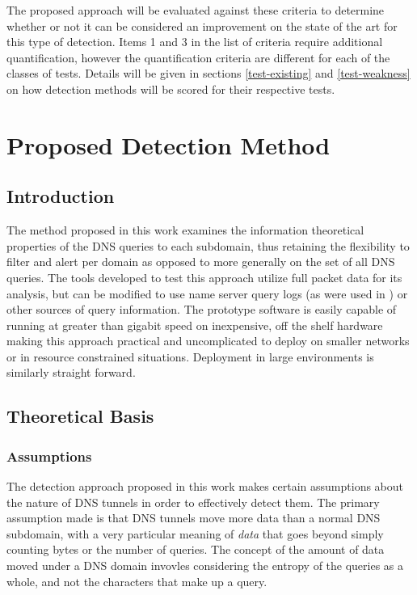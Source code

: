 \documentclass[12pt]{report}
\theoremstyle{remark}
\theoremstyle{definition}
\theoremstyle{definition}
\theoremstyle{definition}
\begin{document}
The proposed approach will be evaluated against these criteria to determine
whether or not it can be considered an improvement on the state of the art for
this type of detection. Items 1 and 3 in the list of criteria require additional
quantification, however the quantification criteria are different for each of
the classes of tests. Details will be given in sections \ref{test-existing} and
\ref{test-weakness} on how detection methods will be scored for their respective
tests.

\chapter{Proposed Detection Method}
\label{proposed-method}

\section{Introduction}
The method proposed in this work examines the information theoretical properties
of the DNS queries to each subdomain, thus retaining the flexibility to filter
and alert per domain as opposed to more generally on the set of all DNS queries.
The tools developed to test this approach utilize full packet data for its
analysis, but can be modified to use name server query logs (as were used in
\cite{Romana2007}) or other sources of query information. The prototype software
is easily capable of running at greater than gigabit speed on inexpensive, off
the shelf hardware making this approach practical and uncomplicated to deploy on
smaller networks or in resource constrained situations. Deployment in large
environments is similarly straight forward.

\section{Theoretical Basis}
\subsection{Assumptions}
The detection approach proposed in this work
makes certain assumptions about the nature of DNS tunnels in order to
effectively detect them. The primary assumption made is that DNS tunnels move
more data than a normal DNS subdomain, with a very particular meaning of
\emph{data} that goes beyond simply counting bytes or the number of queries. The
concept of the amount of data moved under a DNS domain invovles considering the
entropy of the queries as a whole, and not the characters that make up a query.
\end{document}
